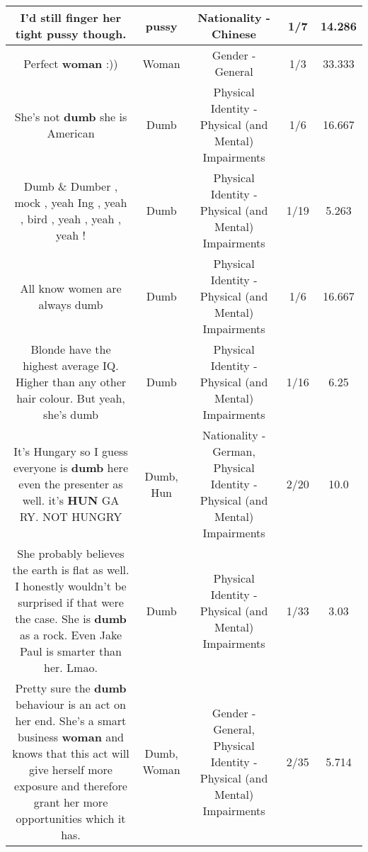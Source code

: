 \documentclass[11pt]{article}
\newlength\mylength
\begin{document}
\begin{center}
\begin{longtable}{|C{.65\mylength}|C{.30\mylength}|C{.12\mylength}|C{.12\mylength}|C{.12\mylength}|}
  \small I'd still finger her tight \textbf{pussy} though.\normalsize   & pussy & Nationality - Chinese & 1/7 & 14.286 \\  \hline
  \small Perfect \textbf{woman} :))\normalsize   & Woman & Gender - General & 1/3 & 33.333 \\  \hline
  \small She's not \textbf{dumb} she is American\normalsize   & Dumb & Physical Identity - Physical (and Mental) Impairments & 1/6 & 16.667 \\  \hline
  \small Dumb \& Dumber , mock , yeah Ing , yeah , bird , yeah , yeah , yeah !\normalsize   & Dumb & Physical Identity - Physical (and Mental) Impairments & 1/19 & 5.263 \\  \hline
  \small All know women are always dumb\normalsize   & Dumb & Physical Identity - Physical (and Mental) Impairments & 1/6 & 16.667 \\  \hline
  \small Blonde have the highest average IQ. Higher than any other hair colour. But yeah, she's dumb\normalsize   & Dumb & Physical Identity - Physical (and Mental) Impairments & 1/16 & 6.25 \\  \hline
  \small It's Hungary so I guess everyone is \textbf{dumb} here even the presenter as well. it's \textbf{HUN} GA RY. NOT HUNGRY\normalsize   & Dumb, Hun & Nationality - German, Physical Identity - Physical (and Mental) Impairments & 2/20 & 10.0 \\  \hline
  \small She probably believes the earth is flat as well. I honestly wouldn't be surprised if that were the case. She is \textbf{dumb} as a rock. Even Jake Paul is smarter than her. Lmao.\normalsize   & Dumb & Physical Identity - Physical (and Mental) Impairments & 1/33 & 3.03 \\  \hline
  \small Pretty sure the \textbf{dumb} behaviour is an act on her end. She's a smart business \textbf{woman} and knows that this act will  give herself more exposure and therefore grant her more opportunities which it has.\normalsize   & Dumb, Woman & Gender - General, Physical Identity - Physical (and Mental) Impairments & 2/35 & 5.714 \\  \hline

\end{longtable}
\end{center}
\end{document}

